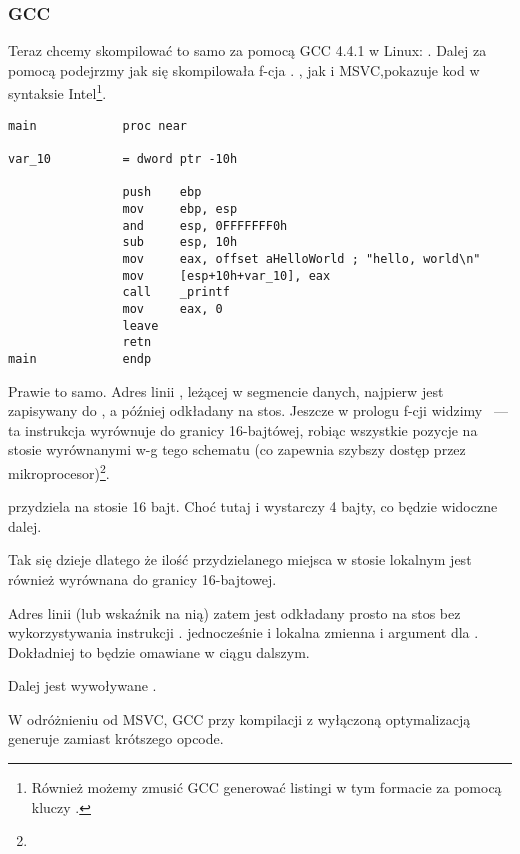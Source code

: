 \subsubsection{GCC}

Teraz chcemy skompilować to samo za pomocą GCC 4.4.1 w Linux: .
Dalej za pomocą \IDA podejrzmy jak się skompilowała f-cja \main.
\IDA, jak i MSVC,pokazuje kod w syntaksie Intel\footnote{Również możemy zmusić GCC generować listingi w tym formacie za pomocą kluczy .}.

\begin{lstlisting}[caption=kod w \IDA,style=customasmx86]
main            proc near

var_10          = dword ptr -10h

                push    ebp
                mov     ebp, esp
                and     esp, 0FFFFFFF0h
                sub     esp, 10h
                mov     eax, offset aHelloWorld ; "hello, world\n"
                mov     [esp+10h+var_10], eax
                call    _printf
                mov     eax, 0
                leave
                retn
main            endp
\end{lstlisting}

Prawie to samo. 
Adres linii , leżącej w segmencie danych, najpierw jest zapisywany do \EAX, a później odkładany na stos.
Jeszcze w prologu f-cji widzimy ~--- 
ta instrukcja wyrównuje \ESP do granicy 16-bajtówej, robiąc wszystkie pozycje 
na stosie wyrównanymi w-g tego schematu (co zapewnia szybszy dostęp przez mikroprocesor)\footnote{\URLWPDA}.

 przydziela na stosie 16 bajt. Choć tutaj i wystarczy 4 bajty, co będzie widoczne dalej.

Tak się dzieje dlatego że ilość przydzielanego miejsca w stosie lokalnym jest również wyrównana do granicy 16-bajtowej.

Adres linii (lub wskaźnik na nią) zatem jest odkładany prosto na stos bez wykorzystywania instrukcji \PUSH.
 jednocześnie i lokalna zmienna i argument dla \printf{}. Dokładniej to będzie omawiane w ciągu dalszym.

Dalej jest wywoływane \printf.

W odróżnieniu od MSVC, GCC przy kompilacji z wyłączoną optymalizacją generuje  zamiast krótszego opcode.

